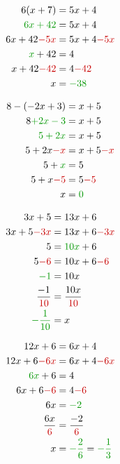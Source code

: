\begin{pagesolutions}
    \begin{tcolorbox}[cartesolution={5}]
        \begin{align*}
            6(x + 7) &= 5x + 4 \\
            \reduc{6x + 42} &= 5x + 4 \\
            6x + 42 \modif{- 5x} &= 5x + 4 \modif{- 5x} \\
            \reduc{x} + 42 &= 4 \\
            x + 42 \modif{- 42} &= 4 \modif{- 42} \\
            x &= \reduc{-38}
        \end{align*}
    \end{tcolorbox}
    \begin{tcolorbox}[cartesolution={6}]
        \begin{align*}
            8 - (-2x + 3) &= x + 5 \\
            8 \reduc{+ 2x - 3} &= x + 5 \\
            \reduc{5 + 2x} &= x + 5 \\
            5 + 2x \modif{- x} &= x + 5 \modif{- x} \\
            5 + \reduc{x} &= 5 \\
            5 + x \modif{- 5} &= 5 \modif{- 5} \\
            x &= \reduc{0}
        \end{align*}
    \end{tcolorbox}
    \begin{tcolorbox}[cartesolution={7}]
        \begin{align*}
            3x + 5 &= 13x + 6 \\
            3x + 5 \modif{- 3x} &= 13x + 6 \modif{- 3x} \\
            5 &= \reduc{10x} + 6 \\
            5 \modif{- 6} &= 10x + 6 \modif{- 6} \\
            \reduc{-1} &= 10x \\
            \frac{-1}{\modif{10}} &= \frac{10x}{\modif{10}} \\
            \reduc{-\frac{1}{10}} &= x
        \end{align*}
    \end{tcolorbox}
    \begin{tcolorbox}[cartesolution={8}]
        \begin{align*}
            12x + 6 &= 6x + 4 \\
            12x + 6 \modif{- 6x} &= 6x + 4 \modif{- 6x} \\
            \reduc{6x} + 6 &= 4 \\
            6x + 6 \modif{- 6} &= 4 \modif{- 6} \\
            6x &= \reduc{-2} \\
            \frac{6x}{\modif{6}} &= \frac{-2}{\modif{6}} \\
            x &= \reduc{-\frac{2}{6}} = \reduc{-\frac{1}{3}}
        \end{align*}
    \end{tcolorbox}
\end{pagesolutions}
